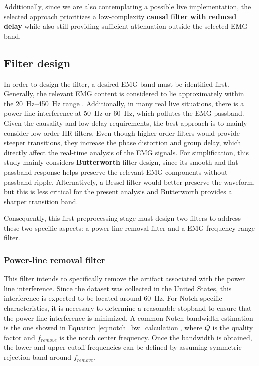 Additionally, since we are also contemplating a possible live implementation, the selected approach prioritizes a low-complexity \textbf{causal filter with reduced delay} while also still providing sufficient attenuation outside the selected EMG band. 

\subsection{Filter design}
In order to design the filter, a desired EMG band must be identified first. Generally, the relevant EMG content is considered to lie approximately within the \qtyrange{20}{450}{\hertz} range \cite{powar_novel_2018}. Additionally, in many real live situations, there is a power line interference at \qty{50}{\hertz} or \qty{60}{\hertz}, which pollutes the EMG passband. Given the causality and low delay requirements, the best approach is to mainly consider low order IIR filters. Even though higher order filters would provide steeper transitions, they increase the phase distortion and group delay, which directly affect the real-time analysis of the EMG signals. For simplification, this study mainly considers \textbf{Butterworth} filter design, since its smooth and flat passband response helps preserve the relevant EMG components without passband ripple. Alternatively, a Bessel filter would better preserve the waveform, but this is less critical for the present analysis and Butterworth provides a sharper transition band.

Consequently, this first preprocessing stage must design two filters to address these two specific aspects: a power-line removal filter and a EMG frequency range filter.

\subsubsection{Power-line removal filter}

This filter intends to specifically remove the artifact associated with the power line interference. Since the dataset was collected in the United States, this interference is expected to be located around \qty{60}{\hertz}. For Notch specific characteristics, it is necessary to determine a reasonable stopband to ensure that the power-line interference is minimized. A common Notch bandwidth estimation is the one showed in Equation \ref{eq:notch_bw_calculation}, where $Q$ is the quality factor and $f_{remove}$ is the notch center frequency. Once the bandwidth is obtained, the lower and upper cutoff frequencies can be defined by assuming symmetric rejection band around $f_{remove}$\cite{noauthor_designnotchpeakiir_nodate}.

